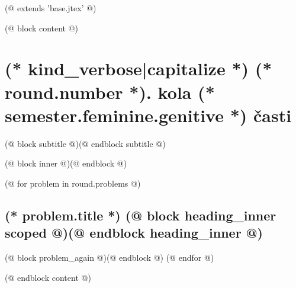 (@ extends 'base.jtex' @)

(@ block content @)
    \thispagestyle{seminar-booklet-first}

    \afterpage{\globaldefs=1\restoregeometry}

    \pagestyle{seminar-booklet-body}


    \section{%
        \texorpdfstring{%
            (* kind_verbose|capitalize *) (* round.number *). kola (* semester.feminine.genitive *) časti%
        }{%
            (* kind_verbose|capitalize *)%
        }%
    }
    (@ block subtitle @)(@ endblock subtitle @)

    \setcounter{volume}{(* volume.number *)}
    \setcounter{semester}{(* semester.number *)}
    \setcounter{round}{(* round.number *)}
    \setcounter{section}{(* round.number *)}
    (@ block inner @)(@ endblock @)

    (@ for problem in round.problems @)%
        \setcounter{problem}{(* problem.number *)}%
        \hypertarget{(* volume.id *)(* semester.id *)(* round.id *)(* problem.id *)-(* kind *)}{
            \subsection{%
                \texorpdfstring{%
                    \large \textbf{(* problem.title *)} \hfill \normalsize%
                    (@ block heading_inner scoped @)(@ endblock heading_inner @)%
                }{%
                    (* round.number *).(* problem.number *) (* problem.title *)%
                }%
            }%
            \label{sec:(* volume.id *)(* semester.id *)(* round.id *)(* problem.id *):(* kind *)}
        }%
        (@ block problem_again @)(@ endblock @)
    (@ endfor @)

(@ endblock content @)
